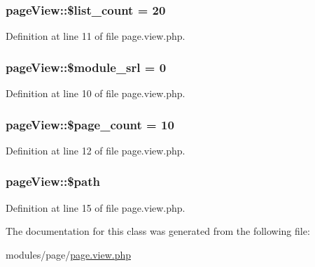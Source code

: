 \subsubsection[{\texorpdfstring{\$list\+\_\+count}{$list_count}}]{\setlength{\rightskip}{0pt plus 5cm}page\+View\+::\$list\+\_\+count = 20}\hypertarget{classpageView_a7010bb0d08c9f9f9dc5a44aeaaa2bb15}{}\label{classpageView_a7010bb0d08c9f9f9dc5a44aeaaa2bb15}


Definition at line 11 of file page.\+view.\+php.

\subsubsection[{\texorpdfstring{\$module\+\_\+srl}{$module_srl}}]{\setlength{\rightskip}{0pt plus 5cm}page\+View\+::\$module\+\_\+srl = 0}\hypertarget{classpageView_add2f52835c01c951adb6b79453417cdf}{}\label{classpageView_add2f52835c01c951adb6b79453417cdf}


Definition at line 10 of file page.\+view.\+php.

\subsubsection[{\texorpdfstring{\$page\+\_\+count}{$page_count}}]{\setlength{\rightskip}{0pt plus 5cm}page\+View\+::\$page\+\_\+count = 10}\hypertarget{classpageView_a2f62b83f9128e0ccbec4a02dbb46962a}{}\label{classpageView_a2f62b83f9128e0ccbec4a02dbb46962a}


Definition at line 12 of file page.\+view.\+php.

\subsubsection[{\texorpdfstring{\$path}{$path}}]{\setlength{\rightskip}{0pt plus 5cm}page\+View\+::\$path}\hypertarget{classpageView_ac629942e1cd4eacbca09412968f4c8e3}{}\label{classpageView_ac629942e1cd4eacbca09412968f4c8e3}


Definition at line 15 of file page.\+view.\+php.



The documentation for this class was generated from the following file\+:\begin{DoxyCompactItemize}
\item 
modules/page/\hyperlink{page_8view_8php}{page.\+view.\+php}\end{DoxyCompactItemize}
